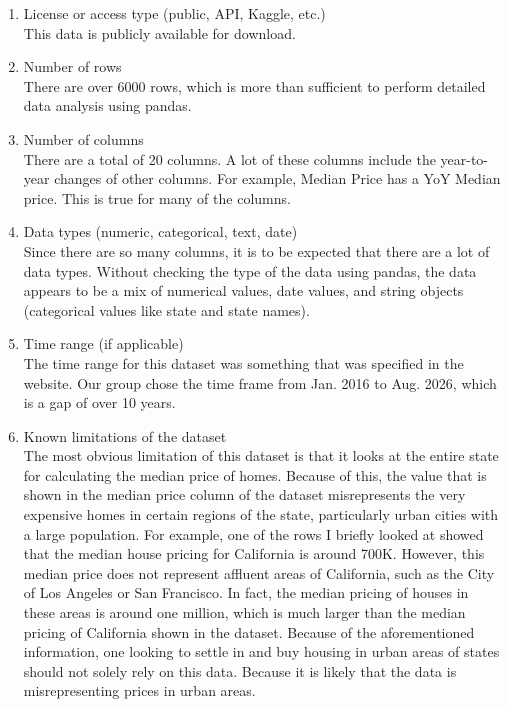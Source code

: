 \documentclass[12pt]{article}
\begin{document}
\begin{enumerate}
		Lastly, they mention that all metrics cover residential properties, which includes single family homes, condo/co-op, town-house, and multi-family houses. They also note that their data is defined consistently with the US Office of Management and Budget metropolitan divisions where they exist, and metropolitan statistical areas elsewhere.
	\item License or access type (public, API, Kaggle, etc.)\\
		This data is publicly available for download.
	\item Number of rows\\
		There are over 6000 rows, which is more than sufficient to perform detailed data analysis using pandas.
	\item Number of columns\\
		There are a total of 20 columns. A lot of these columns include the year-to-year changes of other columns. For example, Median Price has a YoY Median price. This is true for many of the columns.
	\item Data types (numeric, categorical, text, date)\\
		Since there are so many columns, it is to be expected that there are a lot of data types. Without checking the type of the data using pandas, the data appears to be a mix of numerical values, date values, and string objects (categorical values like state and state names).
	\item Time range (if applicable)\\
		The time range for this dataset was something that was specified in the website. Our group chose the time frame from Jan. 2016 to Aug. 2026, which is a gap of over 10 years.
	\item Known limitations of the dataset\\
		The most obvious limitation of this dataset is that it looks at the entire state for calculating the median price of homes. Because of this, the value that is shown in the median price column of the dataset misrepresents the very expensive homes in certain regions of the state, particularly urban cities with a large population. For example, one of the rows I briefly looked at showed that the median house pricing for California is around 700K. However, this median price does not represent affluent areas of California, such as the City of Los Angeles or San Francisco. In fact, the median pricing of houses in these areas is around one million, which is much larger than the median pricing of California shown in the dataset. Because of the aforementioned information, one looking to settle in and buy housing in urban areas of states should not solely rely on this data. Because it is likely that the data is misrepresenting prices in urban areas.


\end{enumerate}
\end{document}
